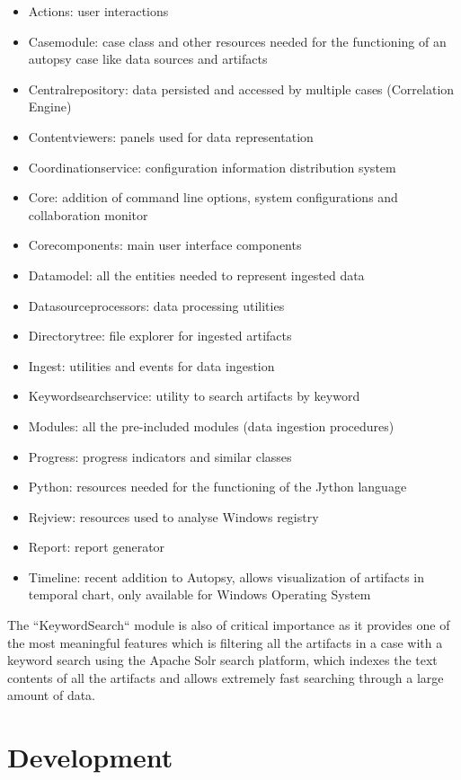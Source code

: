 \begin{itemize}
 \item Actions: user interactions 
 \item Casemodule: case class and other resources needed for the functioning of an autopsy case like data sources and artifacts
 \item Centralrepository: data persisted and accessed by multiple cases (Correlation Engine)
 \item Contentviewers: panels used for data representation 
 \item Coordinationservice: configuration information distribution system
 \item Core: addition of command line options, system configurations and collaboration monitor 
 \item Corecomponents: main user interface components
 \item Datamodel: all the entities needed to represent ingested data
 \item Datasourceprocessors: data processing utilities 
 \item Directorytree: file explorer for ingested artifacts
 \item Ingest: utilities and events for data ingestion 
 \item Keywordsearchservice: utility to search artifacts by keyword 
 \item Modules: all the pre-included modules (data ingestion procedures)
 \item Progress: progress indicators and similar classes
 \item Python: resources needed for the functioning of the Jython language
 \item Rejview: resources used to analyse Windows registry
 \item Report: report generator
 \item Timeline: recent addition to Autopsy, allows visualization of artifacts in temporal chart, only available for Windows Operating System
\end{itemize}

The ``KeywordSearch`` module is also of critical importance as it provides one of the most meaningful features which is filtering all the artifacts in a case with a keyword
search using the Apache Solr search platform, which indexes the text contents of all the artifacts and allows extremely fast searching through a large amount of data.  

\section{Development}

